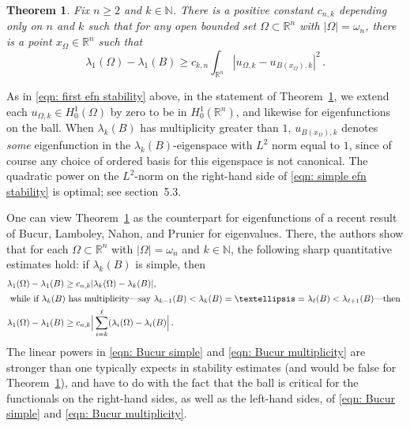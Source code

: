\documentclass[10pt,a4paper]{amsart}
\numberwithin{equation}{section}
\newtheorem{theorem}{Theorem}[section]
\def\R{{\mathbb R}}
\def\W{\Omega}
\providecommand{\href}[2]{#2}
\begin{document}
\begin{theorem}\label{thm: eigenfunction estimates} Fix $n \geq 2$ and $k \in \mathbb{N}$. There is a positive constant $c_{n,k}$ depending only on $n$ and $k$ such that 
for any open bounded set $\Omega \subset \R^n$ with $|\Omega| = \omega_n$, there is a point $x_\W \in \R^n$ such that
\begin{equation}\label{eqn: simple efn stability}
\lambda_1(\W ) - \lambda_1(B)  \geq c_{k, n} \int_{\mathbb{R}^n}\left|u_{\Omega, k}-u_{B({x_\W}),k}\right|^2\,.
 \end{equation}
\end{theorem}
As in \eqref{eqn: first efn stability} above, in the statement of Theorem~\ref{thm: eigenfunction estimates}, we extend each $u_{\W,k} \in H^1_0(\W)$ by zero to be in $H^1_0(\R^n)$, and likewise for eigenfunctions on the ball.  When $\lambda_k(B)$ has multiplicity greater than $1$, $u_{B({x_\W}),k}$ denotes {\it some} eigenfunction in the $\lambda_k(B)$-eigenspace with $L^2$ norm equal to $1$, since of course any choice of ordered basis for this eigenspace is not canonical. The quadratic power on the $L^2$-norm on the right-hand side of \eqref{eqn: simple efn stability} is optimal; see section~\href{https://arxiv.org/abs/2504.13053v2}{5.3}.

One can view Theorem~\ref{thm: eigenfunction estimates} as the counterpart for eigenfunctions of a recent result of Bucur, Lamboley, Nahon, and Prunier \cite{blnp23} for eigenvalues. There, the authors show  that
for each $\Omega \subset \R^n$ with $|\Omega| = \omega_n$ and  $k \in \mathbb{N}$, the following sharp quantitative estimates hold: if $\lambda_k(B)$ is simple, then 
\begin{align}\label{eqn: Bucur simple}
 \lambda_1(\W ) - \lambda_1(B)   & \geq c_{n,k}  |\lambda_k(\W)-\lambda_k(B)|,   \\
 \intertext{
while if $\lambda_k(B)$ has multiplicity---say $\lambda_{k-1}(B) <  \lambda_k(B)=\ldots=\lambda_{\ell}(B) < \lambda_{\ell+1}(B)$---then 
 }
 \label{eqn: Bucur multiplicity}
 \lambda_1(\W ) - \lambda_1(B)    &\geq c_{n,k}    \Big| \sum_{i=k}^\ell ( \lambda_i (\W) - \lambda_i(B) \Big| \,.
\end{align}
The linear powers in \eqref{eqn: Bucur simple} and \eqref{eqn: Bucur multiplicity} are stronger than one typically expects in stability estimates (and would be false for Theorem~\ref{thm: eigenfunction estimates}), and have to do with the fact that the ball is critical for the functionals on the right-hand sides, as well as the left-hand sides, of \eqref{eqn: Bucur simple} and \eqref{eqn: Bucur multiplicity}. 
\end{document}
